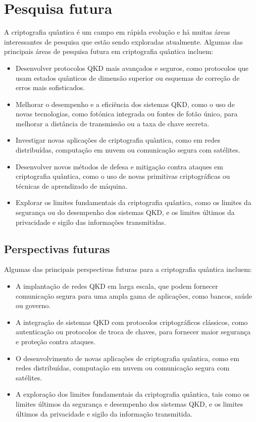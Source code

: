 \chapter{Pesquisa futura}

A criptografia quântica é um campo em rápida evolução e há muitas áreas interessantes de pesquisa que estão sendo exploradas atualmente. Algumas das principais áreas de pesquisa futura em criptografia quântica incluem:

\begin{itemize}
  \item Desenvolver protocolos QKD mais avançados e seguros, como protocolos que usam estados quânticos de dimensão superior ou esquemas de correção de erros mais sofisticados.
  \item Melhorar o desempenho e a eficiência dos sistemas QKD, como o uso de novas tecnologias, como fotónica integrada ou fontes de fotão único, para melhorar a distância de transmissão ou a taxa de chave secreta.
  \item Investigar novas aplicações de criptografia quântica, como em redes distribuídas, computação em nuvem ou comunicação segura com satélites.
  \item Desenvolver novos métodos de defesa e mitigação contra ataques em criptografia quântica, como o uso de novas primitivas criptográficas ou técnicas de aprendizado de máquina.
  \item Explorar os limites fundamentais da criptografia quântica, como os limites da segurança ou do desempenho dos sistemas QKD, e os limites últimos da privacidade e sigilo das informações transmitidas.
\end{itemize}

\section{Perspectivas futuras}

Algumas das principais perspectivas futuras para a criptografia quântica incluem:

\begin{itemize}
  \item A implantação de redes QKD em larga escala, que podem fornecer comunicação segura para uma ampla gama de aplicações, como bancos, saúde ou governo.
  \item A integração de sistemas QKD com protocolos criptográficos clássicos, como autenticação ou protocolos de troca de chaves, para fornecer maior segurança e proteção contra ataques.
  \item O desenvolvimento de novas aplicações de criptografia quântica, como em redes distribuídas, computação em nuvem ou comunicação segura com satélites.
  \item A exploração dos limites fundamentais da criptografia quântica, tais como os limites últimos da segurança e desempenho dos sistemas QKD, e os limites últimos da privacidade e sigilo da informação transmitida.
\end{itemize}

\newpage
